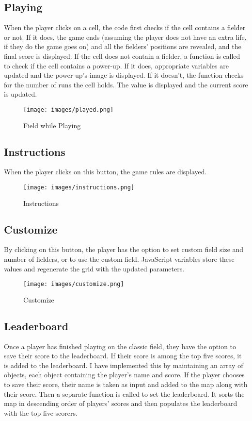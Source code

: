 \documentclass{article}
\begin{document}
\subsection{Playing}
When the player clicks on a cell, the code first checks if the cell contains a fielder or not. If it does, the game ends (assuming the player does not have an extra life, if they do the game goes on) and all the fielders' positions are revealed, and the final score is displayed. If the cell does not contain a fielder, a function is called to check if the cell contains a power-up. If it does, appropriate variables are updated and the power-up's image is displayed. If it doesn't, the function checks for the number of runs the cell holds. The value is displayed and the current score is updated.

\begin{figure}[h!]
    \centering
    \texttt{[image: images/played.png]}
    \caption{Field while Playing}
    \label{fig:enter-label}
\end{figure}

\subsection{Instructions}
When the player clicks on this button, the game rules are displayed.

\begin{figure}[h!]
    \centering
    \texttt{[image: images/instructions.png]}
    \caption{Instructions}
    \label{fig:enter-label}
\end{figure}

\subsection{Customize}
By clicking on this button, the player has the option to set custom field size and number of fielders, or to use the custom field. JavaScript variables store these values and regenerate the grid with the updated parameters.

\begin{figure}[h!]
    \centering
    \texttt{[image: images/customize.png]}
    \caption{Customize}
    \label{fig:enter-label}
\end{figure}

\subsection{Leaderboard}
Once a player has finished playing on the classic field, they have the option to save their score to the leaderboard. If their score is among the top five scores, it is added to the leaderboard. I have implemented this by maintaining an array of objects, each object containing the player's name and score. If the player chooses to save their score, their name is taken as input and added to the map along with their score. Then a separate function is called to set the leaderboard. It sorts the map in descending order of players' scores and then populates the leaderboard with the top five scorers.
\end{document}
